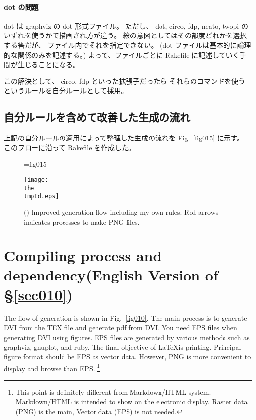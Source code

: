 \documentclass[a4paper,12pt]{jsarticle}
\begin{document}
\paragraph{dot の問題}

dot は graphviz の dot 形式ファイル。
ただし、 dot, circo, fdp, neato, twopi のいずれを使うかで描画され方が違う。
絵の意図としてはその都度どれかを選択する筈だが、
ファイル内でそれを指定できない。
(dot ファイルは基本的に論理的な関係のみを記述する。)
よって、ファイルごとに Rakefile に記述していく手間が生じることになる。

この解決として、
circo, fdp といった拡張子だったら
それらのコマンドを使うというルールを自分ルールとして採用。


\subsection*{自分ルールを含めて改善した生成の流れ}

上記の自分ルールの適用によって整理した生成の流れを Fig.~\ref{fig015} に示す。
このフローに沿って Rakefile を作成した。

\begin{figure}[!htbp]
  \tmpId={fig015}
  \begin{center}
    \texttt{[image: \\the\\tmpId.eps]} %
  \end{center}
  \caption{(\the\tmpId)
    \label{\the\tmpId}
    Improved generation flow including my own rules.
    Red arrows indicates processes to make PNG files. 
  }
\end{figure}

\section{Compiling process and dependency(English Version of \S \ref{sec010})}

\label{sec020}

The flow of generation is shown in Fig.~\ref{fig010}.
The main process is to generate DVI from the TEX file and generate pdf from DVI.
You need EPS files when generating DVI using figures.
EPS files are generated by various methods such as graphviz, gnuplot, and ruby.
The final objective of \LaTeX is printing.
Principal figure format should be EPS as vector data.
However, PNG is more convenient to display and browse than EPS.
\footnote{
  This point is definitely different from Markdown/HTML system.
  Markdown/HTML is intended to show on the electronic display.
  Raster data (PNG) is the main, Vector data (EPS) is not needed.
}
\end{document}
